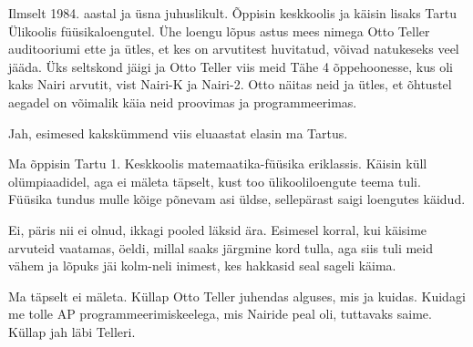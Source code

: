 

Ilmselt 1984. aastal ja üsna juhuslikult.
Õppisin keskkoolis ja käisin lisaks Tartu 
Ülikoolis füüsikaloengutel. Ühe loengu lõpus astus mees nimega Otto 
Teller auditooriumi ette ja ütles, et kes on 
arvutitest huvitatud, võivad natukeseks veel jääda. Üks 
seltskond jäigi ja Otto Teller viis meid Tähe 4 
õppehoonesse, kus oli kaks Nairi arvutit, vist
Nairi-K ja Nairi-2. 
Otto näitas neid ja ütles, et õhtustel 
aegadel on võimalik käia neid proovimas ja programmeerimas.


Jah, esimesed kakskümmend viis eluaastat elasin ma Tartus. 


Ma õppisin Tartu 1. Keskkoolis 
matemaatika-füüsika eriklassis. Käisin küll olümpiaadidel, aga ei mäleta täpselt, 
kust too ülikooliloengute teema tuli. Füüsika tundus mulle kõige 
põnevam asi üldse, sellepärast saigi loengutes käidud.


Ei, päris nii ei olnud, ikkagi pooled läksid ära. Esimesel korral, kui 
käisime arvuteid vaatamas, öeldi, millal saaks järgmine kord
tulla, aga siis tuli meid vähem ja lõpuks jäi 
kolm-neli inimest, kes hakkasid seal sageli käima.


Ma täpselt ei mäleta. Küllap Otto Teller juhendas alguses, mis ja kuidas. Kuidagi me 
tolle AP 
programmeerimiskeelega, mis Nairide peal oli, tuttavaks saime. Küllap jah läbi 
Telleri.

